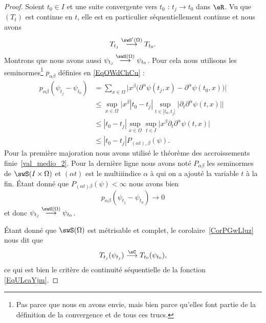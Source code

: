 \begin{proof}
	Soient \( t_0\in I\) et une suite convergente vers \( t_0\) : \( t_j\to t_0\) dans \( \eR\). Vu que \( (T_t)\) est continue en \( t\), elle est en particulier séquentiellement continue et nous avons
	\begin{equation}
		T_{t_j}\stackrel{\swS'(\Omega)}{\longrightarrow}T_{t_0}.
	\end{equation}
	Montrons que nous avons aussi \( \psi_{t_j}\stackrel{\swS(\Omega)}{\longrightarrow}\psi_{t_0}\). Pour cela nous utilisons les seminormes\footnote{Pas parce que nous en avons envie, mais bien parce qu'elles font partie de la définition de la convergence et de tous ces trucs.} \( p_{\alpha\beta}\) définies en \eqref{EqOWdChCu} :
	\begin{subequations}
		\begin{align}
			p_{\alpha\beta}(\psi_{t_j}-\psi_{t_0}) & =\sum_{x\in \Omega}\Big| x^{\beta}\big( \partial^{\alpha}\psi(t_j,x)-\partial^{\alpha}\psi(t_0,x) \big)       \Big|                                  \\
			                                       & \leq\sup_{x\in\Omega}\Big|  x^{\beta}| t_0-t_j |\sup_{t\in \mathopen[ t_0 , t_j \mathclose]}\big| \partial_t\partial^{\alpha}\psi(t,x) \big|   \Big| \\
			                                       & \leq| t_0-t_j |\sup_{x\in\Omega}\sup_{t\in I}\big| x^{\beta}\partial_t\partial^{\alpha}\psi(t,x) \big|                                               \\
			                                       & \leq| t_0-t_j |P_{(\alpha t),\beta}(\psi).
		\end{align}
	\end{subequations}
	Pour la première majoration nous avons utilisé le théorème des accroissements finie~\ref{val_medio_2}. Pour la dernière ligne nous avons noté \( P_{\alpha\beta}\) les seminormes de \( \swS(I\times \Omega)\) et \( (\alpha t)\) est le multiiindice \( \alpha\) à qui on a ajouté la variable \( t\) à la fin. Étant donné que \( P_{(\alpha t)\beta}(\psi)<\infty\) nous avons bien
	\begin{equation}
		p_{\alpha\beta}(\psi_{t_j}-\psi_{t_0})\to 0
	\end{equation}
	et donc \( \psi_{t_j}\stackrel{\swS(\Omega)}{\longrightarrow}\psi_{t_0}\).

	Étant donné que \( \swS(\Omega)\) est métrisable et complet, le corolaire~\ref{CorPGwLluz} nous dit que
	\begin{equation}
		T_{t_j}(\psi_{t_j})\stackrel{\eC}{\longrightarrow} T_{t_0}(\psi_{t_0}),
	\end{equation}
	ce qui est bien le critère de continuité séquentielle de la fonction \eqref{EqULcaYjm}.
\end{proof}

